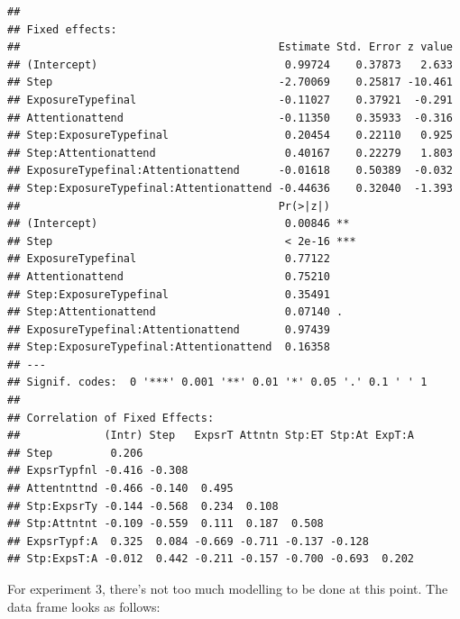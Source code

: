 \documentclass[11pt]{article}\usepackage[]{graphicx}\usepackage[]{color}
\makeatletter
\newenvironment{kframe}{%
 \def\at@end@of@kframe{}%
 \ifinner\ifhmode%
  \def\at@end@of@kframe{\end{minipage}}%
  \begin{minipage}{\columnwidth}%
 \fi\fi%
 \def\FrameCommand##1{\hskip\@totalleftmargin \hskip-\fboxsep
 \colorbox{shadecolor}{##1}\hskip-\fboxsep
     \hskip-\linewidth \hskip-\@totalleftmargin \hskip\columnwidth}%
 \MakeFramed {\advance\hsize-\width
   \@totalleftmargin\z@ \linewidth\hsize
   \@setminipage}}%
 {\par\unskip\endMakeFramed%
 \at@end@of@kframe}
\newenvironment{knitrout}{}{} %
\makeatother
\begin{document}
\begin{knitrout}
\begin{kframe}
\begin{verbatim}
## 
## Fixed effects:
##                                        Estimate Std. Error z value
## (Intercept)                             0.99724    0.37873   2.633
## Step                                   -2.70069    0.25817 -10.461
## ExposureTypefinal                      -0.11027    0.37921  -0.291
## Attentionattend                        -0.11350    0.35933  -0.316
## Step:ExposureTypefinal                  0.20454    0.22110   0.925
## Step:Attentionattend                    0.40167    0.22279   1.803
## ExposureTypefinal:Attentionattend      -0.01618    0.50389  -0.032
## Step:ExposureTypefinal:Attentionattend -0.44636    0.32040  -1.393
##                                        Pr(>|z|)    
## (Intercept)                             0.00846 ** 
## Step                                    < 2e-16 ***
## ExposureTypefinal                       0.77122    
## Attentionattend                         0.75210    
## Step:ExposureTypefinal                  0.35491    
## Step:Attentionattend                    0.07140 .  
## ExposureTypefinal:Attentionattend       0.97439    
## Step:ExposureTypefinal:Attentionattend  0.16358    
## ---
## Signif. codes:  0 '***' 0.001 '**' 0.01 '*' 0.05 '.' 0.1 ' ' 1
## 
## Correlation of Fixed Effects:
##             (Intr) Step   ExpsrT Attntn Stp:ET Stp:At ExpT:A
## Step         0.206                                          
## ExpsrTypfnl -0.416 -0.308                                   
## Attentnttnd -0.466 -0.140  0.495                            
## Stp:ExpsrTy -0.144 -0.568  0.234  0.108                     
## Stp:Attntnt -0.109 -0.559  0.111  0.187  0.508              
## ExpsrTypf:A  0.325  0.084 -0.669 -0.711 -0.137 -0.128       
## Stp:ExpsT:A -0.012  0.442 -0.211 -0.157 -0.700 -0.693  0.202
\end{verbatim}
\end{kframe}
\end{knitrout}

For experiment 3, there's not too much modelling to be done at this point.  The data frame looks as follows:
\end{document}
